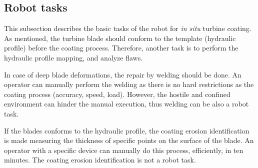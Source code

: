 \subsection{Robot tasks}\label{desc_taref}
This subsection describes the basic tasks of the robot for \textit{in situ}
turbine coating. %
As mentioned, the turbine blade should conform
to the template (hydraulic profile) before the coating process. Therefore,
another task is to perform the hydraulic profile mapping, and analyze flaws.

In case of deep blade deformations, %
the repair by welding should be done. %
An operator can manually perform the welding as there is no hard restrictions as the coating
process (accuracy, speed, load). However, the hostile and confined environment
can hinder the manual execution, thus welding can be also a robot task.

If the blades conforms to the hydraulic profile, the coating erosion
identification is made measuring the thickness of specific points on the
surface of the blade. An operator with a specific device can manually do this
process, efficiently, in ten minutes. The coating erosion identification is not
a robot task.

